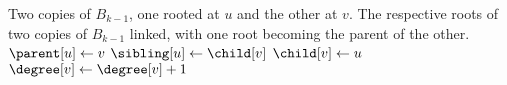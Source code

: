 
\begin{algorithmic}[1]
\Require Two copies of $B_{k-1}$, one rooted at $u$ and the other at $v$.
\Ensure The respective roots of two copies of $B_{k-1}$ linked, with
  one root becoming the parent of the other.
\State $\parent[u] \gets v$
\State $\sibling[u] \gets \child[v]$
\State $\child[v] \gets u$
\State $\degree[v] \gets \degree[v] + 1$
\end{algorithmic}
